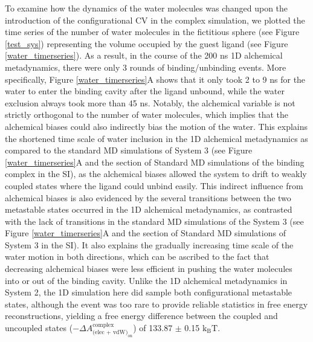 \documentclass[journal=jacsat,manuscript=article]{achemso}
\begin{document}
To examine how the dynamics of the water molecules was changed upon the introduction of the configurational CV in the complex simulation, we plotted the time series of the number of water molecules in the fictitious sphere (see Figure \ref{test_sys}) representing the volume occupied by the guest ligand (see Figure \ref{water_timerseries}). As a result, in the course of the 200 ns 1D alchemical metadynamics, there were only 3 rounds of binding/unbinding events. More specifically, Figure \ref{water_timerseries}A shows that it only took 2 to 9 ns for the water to enter the binding cavity after the ligand unbound, while the water exclusion always took more than 45 ns. Notably, the alchemical variable is not strictly orthogonal to the number of water molecules, which implies that the alchemical biases could also indirectly bias the motion of the water. This explains the shortened time scale of water inclusion in the 1D alchemical metadynamics as compared to the standard MD simulations of System 3 (see Figure \ref{water_timerseries}A and the section of Standard MD simulations of the binding complex in the SI), as the alchemical biases allowed the system to drift to weakly coupled states where the ligand could unbind easily. This indirect influence from alchemical biases is also evidenced by the several transitions between the two metastable states occurred in the 1D alchemical metadynamics, as contrasted with the lack of transitions in the standard MD simulations of the System 3 (see Figure \ref{water_timerseries}A and the section of Standard MD simulations of System 3 in the SI). It also explains the gradually increasing time scale of the water motion in both directions, which can be ascribed to the fact that decreasing alchemical biases were less efficient in pushing the water molecules into or out of the binding cavity. Unlike the 1D alchemical metadynamics in System 2, the 1D simulation here did sample both configurational metastable states, although the event was too rare to provide reliable statistics in free energy reconstructions, yielding a free energy difference between the coupled and uncoupled states ($-\Delta A^{\text{complex}}_{\text{(elec + vdW)}_{\text{on}}}$) of 133.87 $\pm$ 0.15 $\text{k}_{\text{B}}\text{T}$.
\end{document}
